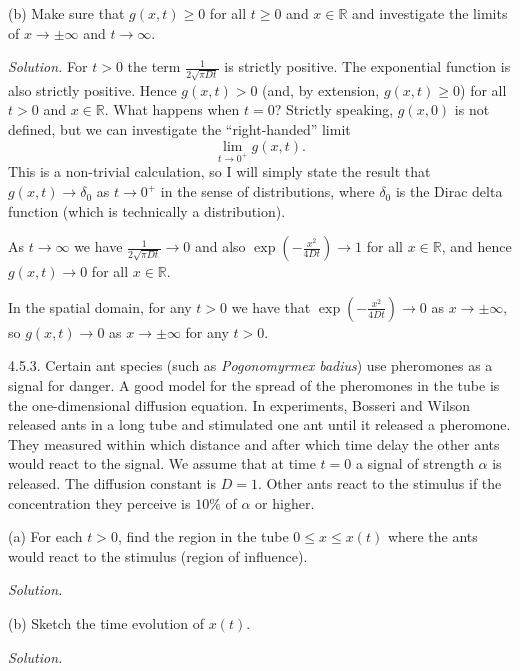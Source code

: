 \documentclass{article}
\newcommand{\R}{\mathbb{R}}
\begin{document}
(b) Make sure that $g(x, t) \geq 0$ for all $t \geq 0$ and $x \in \R$ and
investigate the limits of $x \to \pm \infty$ and $t \to \infty$.

\textit{Solution.}
For $t > 0$ the term $\frac{1}{2 \sqrt{\pi D t}}$ is strictly positive.
The exponential function is also strictly positive. Hence $g(x, t) > 0$
(and, by extension, $g(x, t) \geq 0$) for all $t > 0$ and $x \in \R$.
What happens when $t = 0$? Strictly speaking, $g(x, 0)$ is not defined,
but we can investigate the ``right-handed'' limit
%
\begin{equation*}
    \lim_{t \to 0^+} g(x, t)
    .
\end{equation*}
%
This is a non-trivial calculation, so I will simply state the result
that $g(x, t) \to \delta_0$ as $t \to 0^+$ in the sense of distributions,
where $\delta_0$ is the Dirac delta function (which is technically a
distribution).

As $t \to \infty$ we have $\frac{1}{2 \sqrt{\pi D t}} \to 0$ and also
$\exp ( - \frac{x^2}{4 D t} ) \to 1$ for all $x \in \R$, and
hence $g(x, t) \to 0$ for all $x \in \R$.

In the spatial domain, for any $t > 0$ we have that
$\exp ( - \frac{x^2}{4 D t} ) \to 0$ as $x \to \pm \infty$, so
$g(x, t) \to 0$ as $x \to \pm \infty$ for any $t > 0$.


\newpage

4.5.3. Certain ant species (such as \textit{Pogonomyrmex badius}) use
pheromones as a signal for danger. A good model for the spread of the
pheromones in the tube is the one-dimensional diffusion equation. In
experiments, Bosseri and Wilson released ants in a long tube and stimulated
one ant until it released a pheromone. They measured within which distance
and after which time delay the other ants would react to the signal.
We assume that at time $t = 0$ a signal of strength $\alpha$ is released.
The diffusion constant is $D = 1$. Other ants react to the stimulus if the
concentration they perceive is $10\%$ of $\alpha$ or higher.

(a) For each $t > 0$, find the region in the tube $0 \leq x \leq x(t)$ where
the ants would react to the stimulus (region of influence).

\textit{Solution.}

\vspace{5mm}

(b) Sketch the time evolution of $x(t)$.

\textit{Solution.}

\vspace{5mm}
\end{document}
